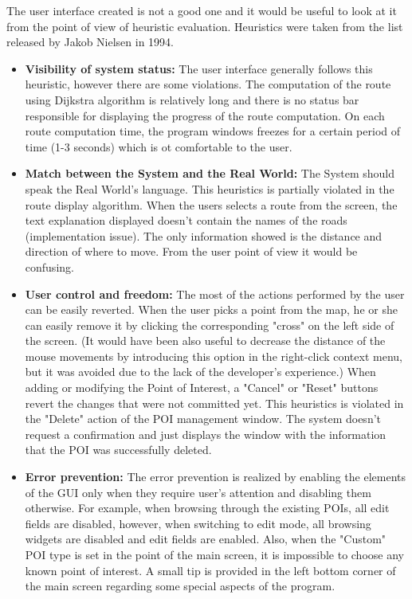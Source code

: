 \documentclass{article}
\begin{document}
The user interface created is not a good one and it would be useful to look at it from the point of view of heuristic evaluation. Heuristics were taken from the list released by Jakob Nielsen in 1994.

\begin{itemize}

	\item \textbf{Visibility of system status: }
	The user interface generally follows this heuristic, however there are some violations. The computation of the route using Dijkstra algorithm is relatively long and there is no status bar responsible for displaying the progress of the route computation. On each route computation time, the program windows freezes for a certain period of time (1-3 seconds) which is ot comfortable to the user.
	
	\item \textbf{Match between the System and the Real World: }
	The System should speak the Real World's language. This heuristics is partially violated in the route display algorithm. When the users selects a route from the screen, the text explanation displayed doesn't contain the names of the roads  (implementation issue). The only information showed is the distance and direction of where to move. From the user point of view it would be confusing.
	
	\item \textbf{User control and freedom: } 
	The most of the actions performed by the user can be easily reverted. When the user picks a point from the map, he or she can easily remove it by clicking the corresponding "cross" on the left side of the screen. (It would have been also useful to decrease the distance of the mouse movements by introducing this option in the right-click context menu, but it was avoided due to the lack of the developer's experience.)
	When adding or modifying the Point of Interest, a "Cancel" or "Reset" buttons revert the changes that were not committed yet.
	This heuristics is violated in the "Delete" action of the POI management window. The system doesn't request a confirmation and just displays the window with the information that the POI was successfully deleted.
	
	\item \textbf{Error prevention: }
	The error prevention is realized by enabling the elements of the GUI only when they require user's attention and disabling them otherwise. For example, when browsing through the existing POIs, all edit fields are disabled, however, when switching to edit mode, all browsing widgets are disabled and edit fields are enabled. Also, when the "Custom" POI type is set in the point of the main screen, it is impossible to choose any known point of interest.
	A small tip is provided in the left bottom corner of the main screen regarding some special aspects of the program.
	

\end{itemize}
\end{document}
